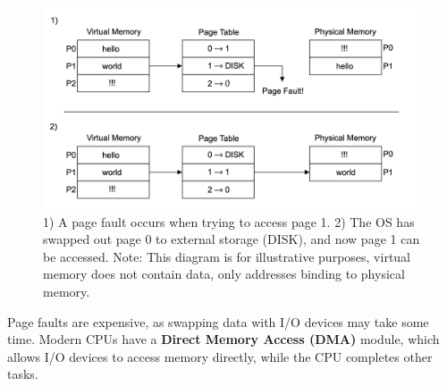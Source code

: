 \vspace{-1em}
\begin{figure}[h]
    \centering
    \includegraphics[width=\textwidth]{Sections/virt/pagefault.png}
    
    \vspace{1em}
    \caption{
        1) A page fault occurs when trying to access page 1. 2) The OS has swapped out page 0 to external storage (DISK), and now page 1 can be accessed.
        Note: This diagram is for illustrative purposes, virtual memory does not contain data, only addresses binding to physical memory.
        }

    \label{fig:virt6}
\end{figure}

\newpage

\begin{Def}

    Page faults are expensive, as swapping data with I/O devices may take some time. Modern CPUs have a \textbf{Direct Memory Access (DMA)} module, which allows I/O devices to access memory directly, while the CPU completes other tasks. 
\end{Def}

